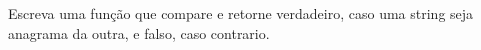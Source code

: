 
\question[10]

Escreva uma função que compare e retorne verdadeiro, caso uma string seja anagrama da outra, e falso, caso contrario.